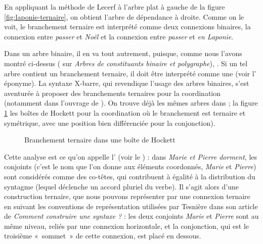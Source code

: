 {    En appliquant la méthode de Lecerf à l’arbre plat à gauche de la figure \ref{fig:laponie-ternaire}, on obtient l’arbre de dépendance à droite. Comme on le voit, le branchement ternaire est interprété comme deux connexions binaires, la connexion entre \textit{passer} et \textit{Noël} et la connexion entre \textit{passer} et \textit{en Laponie}.

    Dans un arbre binaire, il en va tout autrement, puisque, comme nous l’avons montré ci-dessus ( sur \textit{Arbres de constituants binaire et polygraphe}), . Si un tel arbre contient un branchement ternaire, il doit être interprété comme une  (voir l’ éponyme). La syntaxe X-barre, qui revendique l’usage des arbres binaires, s’est aventurée à proposer des branchements ternaires pour la coordination (notamment dans l'ouvrage de \citealt{jackendoff1977x}). On trouve déjà les mêmes arbres dans \citealt{hockett1958course} ; la figure \ref{fig:hockett-coord} les boîtes de Hockett pour la coordination où le branchement est ternaire et symétrique, avec une position bien différenciée pour la conjonction).

\begin{figure}[H]
    \caption{\label{fig:hockett-coord}Branchement ternaire dans une boîte de Hockett}
\end{figure}


    Cette analyse est ce qu’on appelle l’ (voir le ) : dans \textit{Marie et Pierre dorment}, les conjoints (c’est le nom que l’on donne aux éléments coordonnés, \textit{Marie} et \textit{Pierre}) sont considérés comme des co-têtes, qui contribuent à égalité à la distribution du syntagme (lequel déclenche un accord pluriel du verbe). Il s’agit alors d’une construction ternaire, que nous pouvons représenter par une connexion ternaire en suivant les conventions de représentation utilisées par Tesnière dans son article de \citeyear{tesniere1934comment} \textit{Comment construire une syntaxe ?} : les deux conjoints \textit{Marie} et \textit{Pierre} sont au même niveau, reliés par une connexion horizontale, et la conjonction, qui est le troisième «~sommet~» de cette connexion, est placé en dessous.

}
